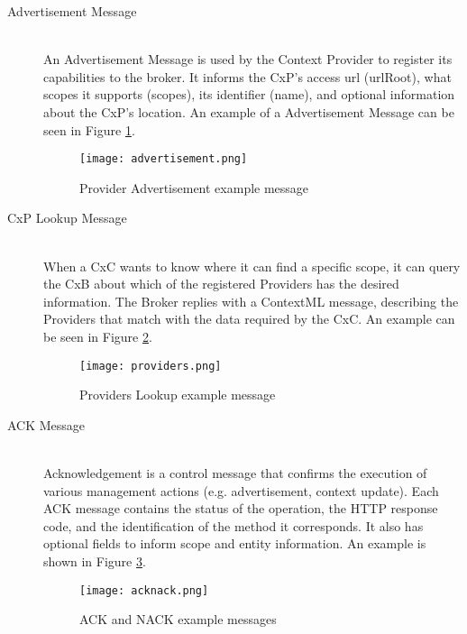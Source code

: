 \begin{description}
\item[Advertisement Message]\hfill \\
An Advertisement Message is used by the Context Provider to register its capabilities to the broker. It informs the CxP’s access url (urlRoot), what scopes it supports (scopes), its identifier (name), and optional information about the CxP’s location. An example of a Advertisement Message can be seen in Figure \ref{fig:advertisement}.

\begin{figure}
	\centering
	\texttt{[image: advertisement.png]}
	\caption{Provider Advertisement example message}
	\label{fig:advertisement}
	
\end{figure}

\item[CxP Lookup Message]\hfill \\
When a CxC wants to know where it can find a specific scope, it can query the CxB about which of the registered Providers has the desired information. The Broker replies with a ContextML message, describing the Providers that match with the data required by the CxC. An example can be seen in Figure \ref{fig:providers}.

\begin{figure}
	\centering
	\texttt{[image: providers.png]}
	\caption{Providers Lookup example message}
	\label{fig:providers}
	
\end{figure}

\item[ACK Message]\hfill \\
Acknowledgement is a control message that confirms the execution of various management actions (e.g. advertisement, context update). Each ACK message contains the status of the operation, the HTTP response code, and the identification of the method it corresponds. It also has optional fields to inform scope and entity information. An example is shown in Figure \ref{fig:acknack}.

\begin{figure}[h]
	\centering
	\texttt{[image: acknack.png]}
	\caption{ACK and NACK example messages}
	\label{fig:acknack}
	
\end{figure}



\end{description}
